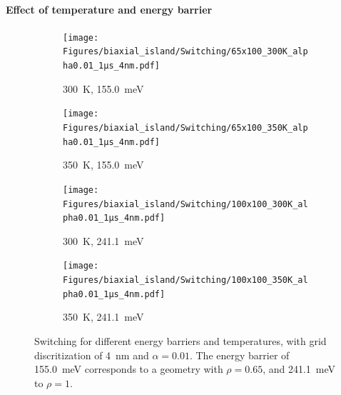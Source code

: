\documentclass[11pt,a4paper,english]{article}
\begin{document}
\paragraph{Effect of temperature and energy barrier}
\begin{figure}
     \centering
     \begin{subfigure}[b]{0.49\textwidth}
         \centering
         \texttt{[image: Figures/biaxial\_island/Switching/65x100\_300K\_alpha0.01\_1µs\_4nm.pdf]}
         \caption{\SI{300}{\kelvin}, \SI{155.0}{\milli\electronvolt}}
         \label{fig:switching-temp-300-65x100}
     \end{subfigure}
     \hfill
     \begin{subfigure}[b]{0.49\textwidth}
         \centering
         \texttt{[image: Figures/biaxial\_island/Switching/65x100\_350K\_alpha0.01\_1µs\_4nm.pdf]}
         \caption{\SI{350}{\kelvin}, \SI{155.0}{\milli\electronvolt}}
         \label{fig:switching-temp-350-65x100}
     \end{subfigure}
     \begin{subfigure}[b]{0.49\textwidth}
         \centering
         \texttt{[image: Figures/biaxial\_island/Switching/100x100\_300K\_alpha0.01\_1µs\_4nm.pdf]}
         \caption{\SI{300}{\kelvin}, \SI{241.1}{\milli\electronvolt}}
         \label{fig:switching-temp-300-100x100}
     \end{subfigure}
     \hfill
     \begin{subfigure}[b]{0.49\textwidth}
         \centering
         \texttt{[image: Figures/biaxial\_island/Switching/100x100\_350K\_alpha0.01\_1µs\_4nm.pdf]}
         \caption{\SI{350}{\kelvin}, \SI{241.1}{\milli\electronvolt}}
         \label{fig:switching-temp-350-100x100}
     \end{subfigure}
    \caption{Switching for different energy barriers and temperatures, with grid discritization of \SI{4}{\nano\metre} and $\alpha = 0.01$. The energy barrier of \SI{155.0}{\milli\electronvolt} corresponds to a geometry with $\rho=0.65$, and \SI{241.1}{\milli\electronvolt} to $\rho=1$.}
    \label{fig:switching-temp}
\end{figure}
\end{document}
